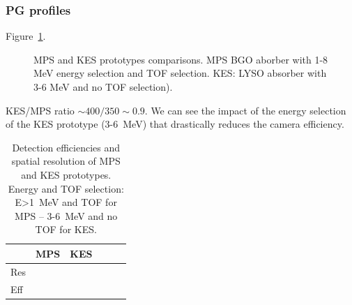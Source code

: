 \documentclass[a4paper,english]{article}
\newcommand{\answ}[1]{\todo[linecolor=blue,backgroundcolor=blue!25,bordercolor=blue]{#1}}
\begin{document}
\subsubsection{PG profiles}

Figure~\ref{fig:PGprofileProtoComp}.

\begin{figure}[!htp]
  \centering
  \quad
  \caption{\label{fig:PGprofileProtoComp} MPS and KES prototypes comparisons. MPS BGO aborber with 1-8 MeV energy selection and TOF selection. KES: LYSO absorber with 3-6 MeV and no TOF selection).}
\end{figure}  

KES/MPS ratio $\sim 400/350 \sim 0.9$. We can see the impact of the energy selection of the KES prototype (3-6~MeV) that drastically reduces the camera efficiency.

\begin{table}[h]
\centering
\begin{tabular}{llllll}
	\midrule
				& MPS			& KES \\
	\midrule
 	Res		& 				&\\
	Eff  	&					&\\
 	\midrule
\end{tabular}
\caption{Detection efficiencies and spatial resolution of MPS and KES prototypes. Energy and TOF selection: E>1~MeV and TOF for MPS -- 3-6~MeV and no TOF for KES.}
\label{tab:ProtoPerformance}
\end{table}
\answ{To be completed}
\end{document}
